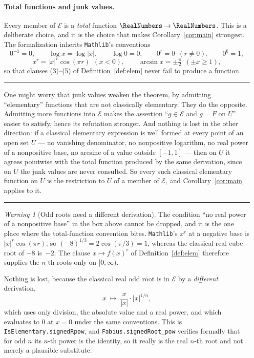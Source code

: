 \documentclass[11pt,oneside]{article}
\theoremstyle{definition}
\theoremstyle{remark}
\newtheorem{warning}[theorem]{Warning}
\newcommand{\Elem}{\mathcal E}
\newenvironment{boxedremark}{%
  \par\smallskip\noindent\begin{center}\begin{minipage}{0.94\textwidth}%
  \color{black}\hrule\vspace{0.6em}\small
}{%
  \vspace{0.6em}\hrule\end{minipage}\end{center}\smallskip
}
\begin{document}
\paragraph{Total functions and junk values.}
Every member of $\Elem$ is a \emph{total} function $\RealNumbers\to\RealNumbers$.  This is a
deliberate choice, and it is the choice that makes Corollary~\ref{cor:main} strongest.
The formalization inherits \texttt{Mathlib}'s conventions
\[
  0^{-1}=0,\qquad \log x=\log|x|,\qquad \log 0=0,\qquad
  0^{r}=0\ \ (r\ne 0),\qquad 0^{0}=1,
\]
\[
  x^{r}=|x|^{r}\cos(\pi r)\ \ (x<0),\qquad
  \arcsin x=\pm\tfrac{\pi}{2}\ \ (\pm x\ge 1),
\]
so that clauses (3)--(5) of Definition~\ref{def:elem} never fail to produce a function.

\begin{boxedremark}
One might worry that junk values weaken the theorem, by admitting
``elementary'' functions that are not classically elementary.  They do the
opposite.  Admitting more functions into $\Elem$ makes the assertion ``$g\in
\Elem$ and $g=F$ on $U$'' easier to satisfy, hence its refutation
stronger.  And nothing is lost in the other direction: if a classical
elementary expression is well formed at every point of an open set $U$ --- no
vanishing denominator, no nonpositive logarithm, no real power of a
nonpositive base, no arcsine of a value outside $[-1,1]$ --- then on $U$ it
agrees pointwise with the total function produced by the same derivation,
since on $U$ the junk values are never consulted.  So every such classical
elementary function on $U$ is the restriction to $U$ of a member of $\Elem$,
and Corollary~\ref{cor:main} applies to it.
\end{boxedremark}

\begin{warning}[Odd roots need a different derivation]\label{warn:oddroot}
The condition ``no real power of a nonpositive base'' in the box above cannot
be dropped, and it is the one place where the total-function convention bites.
\texttt{Mathlib}'s $x^{r}$ at a negative base is $|x|^{r}\cos(\pi r)$, so
$(-8)^{1/3}=2\cos(\pi/3)=1$, whereas the classical real cube root of $-8$
is~$-2$.  The clause $x\mapsto f(x)^{r}$ of Definition~\ref{def:elem} therefore supplies
the $n$-th roots only on $[0,\infty)$.

Nothing is lost, because the classical real odd root is in $\Elem$ by a
\emph{different} derivation,
\[
  x\ \longmapsto\ \frac{x}{|x|}\cdot|x|^{1/n},
\]
which uses only division, the absolute value and a real power, and which
evaluates to $0$ at $x=0$ under the same conventions.  This is
\texttt{IsElementary.signedRpow}, and
\texttt{Fabius.signedRoot\_pow} verifies formally that for odd $n$ its $n$-th
power is the identity, so it really is the real $n$-th root and not merely a
plausible substitute.
\end{warning}
\end{document}
